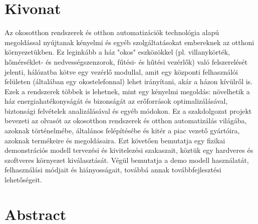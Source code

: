 \setcounter{page}{1}

\selecthungarian

\chapter*{Kivonat}

Az okosotthon rendszerek és otthon automatizációk technológia alapú megoldással nyújtanak kényelmi és egyéb szolgáltatásokat embereknek az otthoni környezetükben. Ez leginkább a ház "okos" eszközökkel (pl. villanykörték, hőmérséklet- és nedvességszenzorok, fűtési- és hűtési vezérlők) való felszerelését jelenti, hálózatba kötve egy vezérlő modullal, amit egy központi felhasználói felületen (általában egy okostelefonnal) lehet irányítani, akár a házon kívülről is. Ezek a rendszerek többek is lehetnek, mint egy kényelmi megoldás: növelhetik a ház energiahatékonyságát és bizonságát az erőforrások optimalizálásával, biztonsági felvételek analizálásával és egyéb módokon. Ez a szakdolgozat projekt bevezeti az olvasót az okosotthon rendszerek és otthon automatizálás világába, azoknak történelmébe, általános felépítésébe és kitér a piac vezető gyártóira, azoknak termékeire és megoldásaira. Ezt követően bemutatja egy fizikai demonstrációs modell tervezési és kivitelezési szakaszait, köztük egy hardveres és szoftveres környezet kiválasztását. Végül bemutatja a demo modell használatát, felhasználási módjait és hiányosságait, továbbá annak továbbfejlesztési lehetőségeit.

\vfill
\selectenglish

\chapter*{Abstract}

